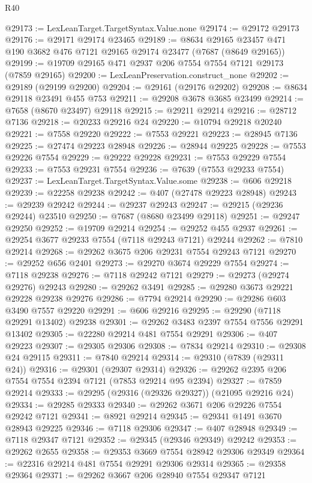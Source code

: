 \begin{lexlean}{R40}
\begin{coremodule}
@29173 := LexLeanTarget.TargetSyntax.Value.none
@29174 := @29172 @29173
@29176 := @29171 @29174 @23465
@29189 := @8634 @29165 @23457 @471 @190 @3682 @476 @7121 @29165 @29174 @23477 (@7687 (@8649 @29165))
@29199 := @19709 @29165 @471 @2937 @206 @7554 @7554 @7121 @29173 (@7859 @29165)
@29200 := LexLeanPreservation.construct_none
@29202 := @29189 (@29199 @29200)
@29204 := @29161 (@29176 @29202)
@29208 := @8634 @29118 @23491 @455 @753
@29211 := @29208 @3678 @3685 @23499
@29214 := @7658 (@8670 @23497) @29118
@29215 := @29211 @29214
@29216 := @28712 @7136
@29218 := @20233 @29216 @24
@29220 := @10794 @29218 @20240
@29221 := @7558 @29220
@29222 := @7553 @29221
@29223 := @28945 @7136
@29225 := @27474 @29223 @28948
@29226 := @28944 @29225
@29228 := @7553 @29226 @7554
@29229 := @29222 @29228
@29231 := @7553 @29229 @7554
@29233 := @7553 @29231 @7554
@29236 := @7639 (@7553 @29233 @7554)
@29237 := LexLeanTarget.TargetSyntax.Value.some
@29238 := @606 @29218
@29239 := @22258 @29238
@29242 := @407 (@27478 @29223 @28948)
@29243 := @29239 @29242
@29244 := @29237 @29243
@29247 := @29215 (@29236 @29244) @23510
@29250 := @7687 (@8680 @23499 @29118)
@29251 := @29247 @29250
@29252 := @19709 @29214
@29254 := @29252 @455 @2937
@29261 := @29254 @3677 @29233 @7554 (@7118 @29243 @7121) @29244
@29262 := @7810 @29214
@29268 := @29262 @3675 @206 @29231 @7554 @29243 @7121
@29270 := @29252 @656 @2401
@29273 := @29270 @3674 @29229 @7554
@29274 := @7118 @29238
@29276 := @7118 @29242 @7121
@29279 := @29273 (@29274 @29276) @29243
@29280 := @29262 @3491
@29285 := @29280 @3673 @29221 @29228 @29238 @29276
@29286 := @7794 @29214
@29290 := @29286 @603 @3490 @7557 @29220
@29291 := @606 @29216
@29295 := @29290 (@7118 @29291 @13402) @29238
@29301 := @29262 @3483 @2397 @7554 @7556 @29291 @13402
@29305 := @22280 @29214 @481 @7554 @29291
@29306 := @407 @29223
@29307 := @29305 @29306
@29308 := @7834 @29214
@29310 := @29308 @24 @29115
@29311 := @7840 @29214
@29314 := @29310 (@7839 (@29311 @24))
@29316 := @29301 (@29307 @29314)
@29326 := @29262 @2395 @206 @7554 @7554 @2394 @7121 (@7853 @29214 @95 @2394)
@29327 := @7859 @29214
@29333 := @29295 (@29316 (@29326 @29327)) (@21095 @29216 @24)
@29334 := @29285 @29333
@29340 := @29262 @3671 @206 @29226 @7554 @29242 @7121
@29341 := @8921 @29214
@29345 := @29341 @1491 @3670 @28943 @29225
@29346 := @7118 @29306
@29347 := @407 @28948
@29349 := @7118 @29347 @7121
@29352 := @29345 (@29346 @29349) @29242
@29353 := @29262 @2655
@29358 := @29353 @3669 @7554 @28942 @29306 @29349
@29364 := @22316 @29214 @481 @7554 @29291 @29306 @29314
@29365 := @29358 @29364
@29371 := @29262 @3667 @206 @28940 @7554 @29347 @7121

\end{coremodule}
\end{lexlean}
